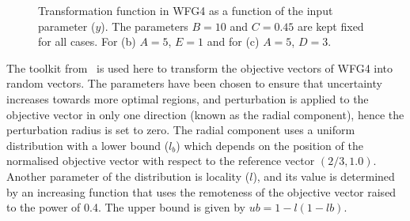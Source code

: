 \documentclass{llncs}
\begin{document}
\begin{figure}
\centering
{}
 \caption{Transformation function in WFG4 as a function of the input parameter ($y$). The parameters $B=10$ and $C=0.45$ are kept fixed for all cases. For (b) $A=5$, $E=1$ and for (c) $A=5$, $D=3$.}
 \label{fig:transformation_function}
\end{figure}

The toolkit from~\cite{Salomon2016Toolkit} is used here to transform the objective vectors of WFG4 into random vectors. The parameters have been chosen to ensure that uncertainty increases towards more optimal regions, and perturbation is applied to the objective vector in only one direction (known as the radial component), hence the perturbation radius is set to zero. The radial component uses a uniform distribution with a lower bound ($l_b$) which depends on the position of the normalised objective vector with respect to the reference vector $(2/3,1.0)$. Another parameter of the distribution is locality ($l$), and its value is determined by an increasing function that uses the remoteness of the objective vector raised to the power of 0.4. The upper bound is given by $ub=1-l(1-lb)$. 
\end{document}
